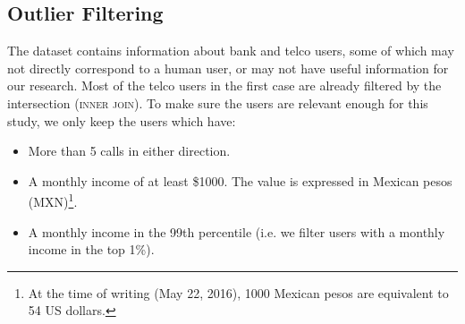\subsection{Outlier Filtering}

The dataset contains information about bank and telco users, some of which may not directly correspond to a human user, %
or may not have useful information for our research.
Most of the telco users in the first case are already filtered by the intersection (\textsc{inner join}). To make sure the users are relevant enough for this study, we only keep the users which have:

\begin{itemize}
	\item More than 5 calls in either direction.
	\item A monthly income of at least \$\num{1000}.
	The value is expressed in Mexican pesos (MXN)\footnote{At the time of writing (May 22, 2016), 1000 Mexican pesos are equivalent to 54 US dollars.}.
	\item A monthly income in the \num{99}th percentile (i.e. we filter users with a monthly income in the top 1\%).
\end{itemize}
